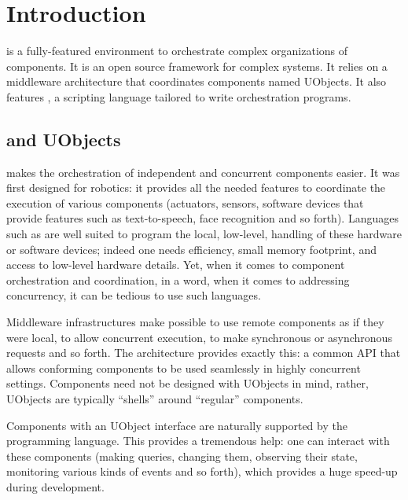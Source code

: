 
\chapter{Introduction}

\usdk is a fully-featured environment to orchestrate complex organizations
of components.  It is an open source framework for 
complex systems.  It relies on a middleware architecture that coordinates
components named UObjects.  It also features \us, a scripting language
tailored to write orchestration programs.

\section{\urbi and UObjects}

\urbi makes the orchestration of independent and concurrent components
easier.  It was first designed for robotics: it provides all the needed
features to coordinate the execution of various components (actuators,
sensors, software devices that provide features such as text-to-speech, face
recognition and so forth).  Languages such as \Cxx are well suited to
program the local, low-level, handling of these hardware or software
devices; indeed one needs efficiency, small memory footprint, and access to
low-level hardware details.  Yet, when it comes to component orchestration
and coordination, in a word, when it comes to addressing concurrency, it can
be tedious to use such languages.

Middleware infrastructures make possible to use remote components as if they
were local, to allow concurrent execution, to make synchronous or
asynchronous requests and so forth.  The  \Cxx architecture
provides exactly this: a common API that allows conforming components to be
used seamlessly in highly concurrent settings.  Components need not be
designed with UObjects in mind, rather, UObjects are typically ``shells''
around ``regular'' components.

Components with an UObject interface are naturally supported by the \us
programming language.  This provides a tremendous help: one can interact
with these components (making queries, changing them, observing their state,
monitoring various kinds of events and so forth), which provides a huge
speed-up during development.

